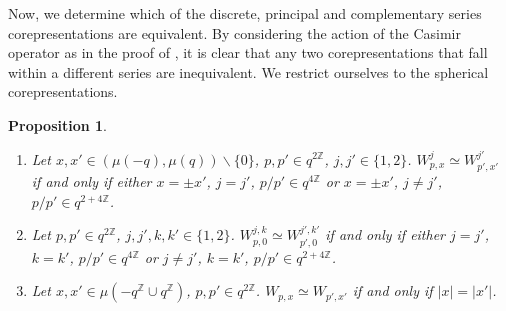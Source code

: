 \documentclass[pdftex]{sigma}
\numberwithin{equation}{section}
\newtheorem{prop}[thm]{Proposition}
\theoremstyle{definition}
\begin{document}
 Now, we determine which of the discrete, principal and complementary series corepresentations are equivalent. By considering the action of the Casimir operator as in the proof of \cite[Proposition~B.1]{CasKoe}, it is clear that any two corepresentations that fall within a dif\/ferent series are inequivalent. We restrict ourselves to the spherical corepresentations.
\begin{prop}\label{PropEqCorep}\qquad
\begin{enumerate}\itemsep=0pt
 \item\label{ItemEqCorep} Let $x, x' \in (\mu(-q),\mu(q)) \backslash \{ 0 \}$, $p,p'\in q^{2\mathbb{Z}}$, $j, j' \in \{1,2\}$. $W_{p,x}^j \simeq W_{p',x'}^{j'}$ if and only if either $x = \pm x'$, $j=j'$, $p/p' \in q^{4 \mathbb{Z}}$ or $x = \pm x'$, $j \not= j'$, $p/p' \in q^{2+4 \mathbb{Z}}$.
\item  Let $p,p'\in q^{2\mathbb{Z}}$, $j, j', k, k' \in \{1,2\}$. $W_{p,0}^{j,k} \simeq W_{p',0}^{j',k'}$ if and only if either $j=j'$, $k=k'$, $p/p'\in q^{4\mathbb{Z}}$ or $j\not = j'$, $k=k'$, $p/p'\in q^{2+4\mathbb{Z}}$.
\item Let $x, x' \in \mu(-q^{\mathbb{Z}} \cup q^{\mathbb{Z}})$, $p,p'\in q^{2\mathbb{Z}}$. $W_{p,x} \simeq W_{p', x'}$ if and only if $\vert x \vert = \vert x' \vert$.
\end{enumerate}
\end{prop}
\end{document}
